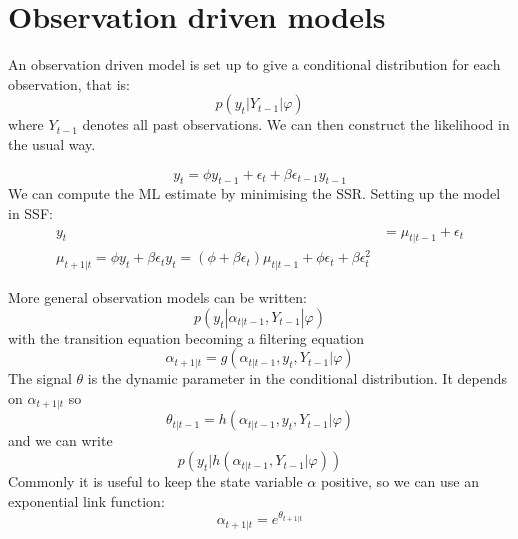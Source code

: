 \documentclass[DIV=14,titlepage=false]{scrreprt}
\begin{document}
\section{Observation driven models}
An observation driven model is set up to give a conditional distribution for each observation, that is:
\[
    p(y_t|Y_{t-1}|\varphi)
\]
where $Y_{t-1}$ denotes all past observations. We can then construct the likelihood in the usual way.
\begin{example}
    \[
        y_t = \phi y_{t-1} + \epsilon_t + \beta \epsilon_{t-1} y_{t-1}
    \]
    We can compute the ML estimate by minimising the SSR. Setting up the model in SSF:
    \begin{align*}
        y_t &= \mu_{t|t-1} + \epsilon_t\\
        \mu_{t+1|t} = \phi y_t + \beta \epsilon_t y_t = (\phi + \beta \epsilon_t)\mu_{t|t-1} + \phi \epsilon_t + \beta \epsilon_t^2
    \end{align*}
\end{example}
More general observation models can be written:
\[
    p(y_t | \alpha_{t|t-1}, Y_{t-1}|\varphi)
\]
with the transition equation becoming a filtering equation\[
    \alpha_{t+1|t} = g(\alpha_{t|t-1}, y_t, Y_{t-1}|\varphi)
\]
The signal $\theta$ is the dynamic parameter in the conditional distribution. It depends on $\alpha_{t+1|t}$ so \[
    \theta_{t|t-1} = h(\alpha_{t|t-1}, y_t, Y_{t-1}|\varphi)
    \]
    and we can write
    \[
        p(y_t|h(\alpha_{t|t-1}, Y_{t-1}|\varphi))   
    \]
Commonly it is useful to keep the state variable $\alpha$ positive, so we can use an exponential link function:
\[
    \alpha_{t+1|t} = e^{\theta_{t+1|t}}
\]
\end{document}
